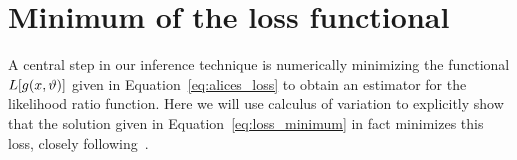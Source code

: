 \documentclass[twocolumn]{aastex63}
\begin{document}

\appendix
\section{Minimum of the loss functional}
\label{app:variation}

A central step in our inference technique is numerically minimizing the functional $L[g(x, \vartheta)]$ given in Equation~\eqref{eq:alices_loss} to obtain an estimator for the likelihood ratio function. Here we will use calculus of variation to explicitly show that the solution given in Equation~\eqref{eq:loss_minimum} in fact minimizes this loss, closely following~\citet{1805.00020, Stoye:2018ovl}.
\end{document}
